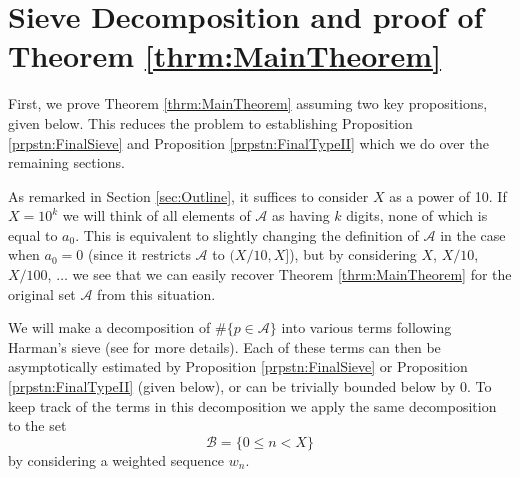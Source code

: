 \documentclass[10pt]{amsart}
\theoremstyle{plain}
\numberwithin{sblmm}{thrm}
\numberwithin{equation}{section}
\begin{document}
\section{Sieve Decomposition and proof of Theorem \ref{thrm:MainTheorem}}\label{sec:Decomposition}
%
%
%
First, we prove Theorem \ref{thrm:MainTheorem} assuming two key propositions, given below. This reduces the problem to establishing Proposition \ref{prpstn:FinalSieve} and Proposition \ref{prpstn:FinalTypeII} which we do over the remaining sections.

As remarked in Section \ref{sec:Outline}, it suffices to consider $X$ as a power of 10. If $X=10^k$ we will think of all elements of $\mathcal{A}$ as having $k$ digits, none of which is equal to $a_0$. This is equivalent to slightly changing the definition of $\mathcal{A}$ in the case when $a_0=0$ (since it restricts $\mathcal{A}$ to $(X/10,X]$), but by considering $X$, $X/10$, $X/100$, $\dots$ we see that we can easily recover Theorem \ref{thrm:MainTheorem} for the original set $\mathcal{A}$ from this situation. 

We will make a decomposition of $\#\{p\in\mathcal{A}{}\}$ into various terms following Harman's sieve (see \cite{HarmanBook} for more details). Each of these terms can then be asymptotically estimated by Proposition \ref{prpstn:FinalSieve} or Proposition \ref{prpstn:FinalTypeII} (given below), or can be trivially bounded below by 0. To keep track of the terms in this decomposition we apply the same decomposition to the set 
\[
\mathcal{B}=\{0\le n< X\}
\]
 by considering a weighted sequence $w_n$.
\end{document}
